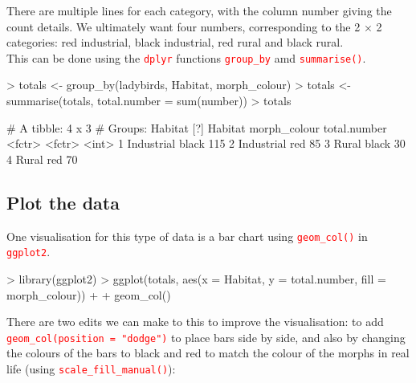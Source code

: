 \documentclass[a4paper,12pt]{article}
\newcommand\code[1]{\textcolor{red}{\texttt{#1}}}
\begin{document}
There are multiple lines for each category, with the column number giving the count details. We ultimately want four numbers, corresponding to the 2 $\times$ 2 categories: red industrial, black industrial, red rural and black rural. \\

This can be done using the \code{dplyr} functions \code{group\_by} amd \code{summarise()}.

\begin{shaded}
\begin{Schunk}
\begin{Sinput}
> totals <- group_by(ladybirds, Habitat, morph_colour)
> totals <- summarise(totals, total.number = sum(number))
> totals
\end{Sinput}
\begin{Soutput}
# A tibble: 4 x 3
# Groups:   Habitat [?]
     Habitat morph_colour total.number
      <fctr>       <fctr>        <int>
1 Industrial        black          115
2 Industrial          red           85
3      Rural        black           30
4      Rural          red           70
\end{Soutput}
\end{Schunk}
\end{shaded}


\subsection{Plot the data}

One visualisation for this type of data is a bar chart using \code{geom\_col()} in \code{ggplot2}.


\begin{shaded}
\begin{Schunk}
\begin{Sinput}
> library(ggplot2)
> ggplot(totals, aes(x = Habitat, y = total.number, fill = morph_colour)) +
+   geom_col() 
\end{Sinput}
\end{Schunk}
\end{shaded}

There are two edits we can make to this to improve the visualisation: to add \code{geom\_col(position = "dodge")} to place bars side by side, and also by changing the colours of the bars to black and red to match the colour of the morphs in real life (using \code{scale\_fill\_manual()}):
\end{document}
